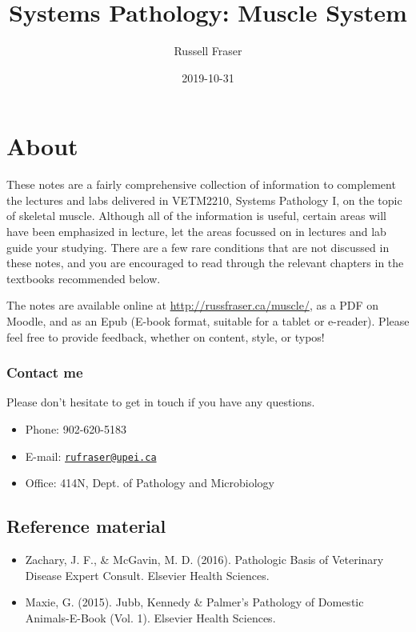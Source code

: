 \documentclass[openany]{report}
\title{Systems Pathology: Muscle System}
\author{Russell Fraser}
\date{2019-10-31}
\providecommand{\tightlist}{%
  \setlength{\itemsep}{0pt}\setlength{\parskip}{0pt}}
\begin{document}
\maketitle

{
\setcounter{tocdepth}{1}
\tableofcontents
}
\chapter*{About}\label{about}

These notes are a fairly comprehensive collection of information to
complement the lectures and labs delivered in VETM2210, Systems
Pathology I, on the topic of skeletal muscle. Although all of the
information is useful, certain areas will have been emphasized in
lecture, let the areas focussed on in lectures and lab guide your
studying. There are a few rare conditions that are not discussed in
these notes, and you are encouraged to read through the relevant
chapters in the textbooks recommended below.

The notes are available online at \url{http://russfraser.ca/muscle/}, as
a PDF on Moodle, and as an Epub (E-book format, suitable for a tablet or
e-reader). Please feel free to provide feedback, whether on content,
style, or typos!

\subsection*{Contact me}\label{contact-me}

Please don't hesitate to get in touch if you have any questions.

\begin{itemize}
\tightlist
\item
  Phone: 902-620-5183
\item
  E-mail: \href{mailto:rufraser@upei.ca}{\nolinkurl{rufraser@upei.ca}}
\item
  Office: 414N, Dept. of Pathology and Microbiology
\end{itemize}

\section*{Reference material}\label{reference-material}

\begin{itemize}
\tightlist
\item
  Zachary, J. F., \& McGavin, M. D. (2016). Pathologic Basis of
  Veterinary Disease Expert Consult. Elsevier Health Sciences.
\item
  Maxie, G. (2015). Jubb, Kennedy \& Palmer's Pathology of Domestic
  Animals-E-Book (Vol. 1). Elsevier Health Sciences.
\end{itemize}
\end{document}
